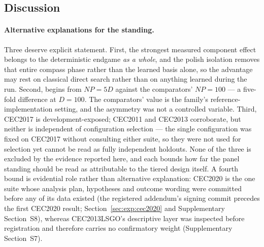 \subsection{Discussion}\label{sec:exp:discussion}

\paragraph{Alternative explanations for the standing.}
Three deserve explicit statement. First, the strongest measured component
effect belongs to the deterministic endgame \emph{as a whole}, and the polish
isolation removes that entire compass phase rather than the learned basis
alone, so the advantage may rest on classical direct search rather than on
anything learned during the run. Second, \dtgsk{} begins from
$NP = 5D$ against the comparators' $NP = 100$ --- a five-fold difference
at $D = 100$. The comparators' value is the family's
reference-implementation setting, and the asymmetry was not a controlled
variable. Third, CEC2017 is
development-exposed; CEC2011 and CEC2013 corroborate, but neither is
independent of configuration selection --- the single configuration was fixed on
CEC2017 without consulting either suite, so they were not used for selection yet
cannot be read as fully independent holdouts. None of the three is excluded by the
evidence reported here, and each bounds how far the panel standing should be
read as attributable to the tiered design itself. A fourth bound is
evidential role rather than alternative explanation: CEC2020 is the one
suite whose analysis plan, hypotheses and outcome wording were committed
before any of its data existed (the registered addendum's signing commit
precedes the first CEC2020 result; Section~\ref{sec:exp:cec2020} and
Supplementary Section~S8), whereas CEC2013LSGO's descriptive layer was
inspected before registration and therefore carries no confirmatory
weight (Supplementary Section~S7).

